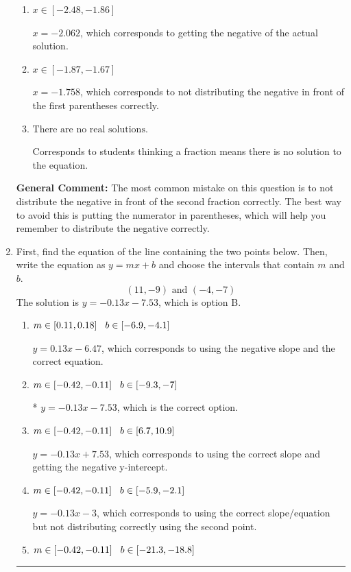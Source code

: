 \documentclass{extbook}[14pt]
\newcommand{\litem}[1]{\item #1

\rule{\textwidth}{0.4pt}}
\begin{document}
\begin{enumerate}
{\begin{enumerate}[label=\Alph*.]
$x = 1.758$, which corresponds to not distributing the negative in front of the second parentheses correctly.
\item \( x \in [-2.48, -1.86] \)

$x = -2.062$, which corresponds to getting the negative of the actual solution.
\item \( x \in [-1.87, -1.67] \)

$x = -1.758$, which corresponds to not distributing the negative in front of the first parentheses correctly.
\item \( \text{There are no real solutions.} \)

Corresponds to students thinking a fraction means there is no solution to the equation.
\end{enumerate}

\textbf{General Comment:} The most common mistake on this question is to not distribute the negative in front of the second fraction correctly. The best way to avoid this is putting the numerator in parentheses, which will help you remember to distribute the negative correctly.
}
\litem{
First, find the equation of the line containing the two points below. Then, write the equation as $ y=mx+b $ and choose the intervals that contain $m$ and $b$.
\[ (11, -9) \text{ and } (-4, -7) \]The solution is \( y = -0.13x -7.53 \), which is option B.\begin{enumerate}[label=\Alph*.]
\item \( m \in [0.11, 0.18] \hspace*{3mm} b \in [-6.9, -4.1] \)

 $y = 0.13x -6.47$, which corresponds to using the negative slope and the correct equation.
\item \( m \in [-0.42, -0.11] \hspace*{3mm} b \in [-9.3, -7] \)

* $y = -0.13x -7.53$, which is the correct option.
\item \( m \in [-0.42, -0.11] \hspace*{3mm} b \in [6.7, 10.9] \)

 $y = -0.13x + 7.53$, which corresponds to using the correct slope and getting the negative y-intercept.
\item \( m \in [-0.42, -0.11] \hspace*{3mm} b \in [-5.9, -2.1] \)

 $y = -0.13x -3$, which corresponds to using the correct slope/equation but not distributing correctly using the second point.
\item \( m \in [-0.42, -0.11] \hspace*{3mm} b \in [-21.3, -18.8] \)


\end{enumerate}}
\end{enumerate}
\end{document}
